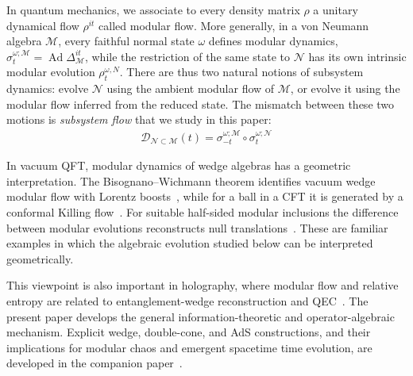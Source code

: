 \documentclass[a4paper,11pt]{article}
\theoremstyle{definition}
\newcommand{\mN}{\mathcal{N}}
\newcommand{\mM}{\mathcal{M}}
\begin{document}
In quantum mechanics, we associate to every density matrix $\rho$ a unitary dynamical flow $\rho^{it}$ called modular flow. More generally, in a von Neumann algebra $\mM$, every faithful normal state $\omega$ defines modular dynamics, $
    \sigma_t^{\omega;\mM}
    =
    \operatorname{Ad}\Delta_{\mM}^{it}$,
while the restriction of the same state to $\mN$ has its own intrinsic modular evolution $\rho_t^{\omega,N}$. There are thus two natural notions of subsystem dynamics: evolve $\mN$ using the ambient modular flow of $\mM$, or evolve it using the modular flow inferred from the reduced state.  The mismatch between these two motions is \emph{subsystem flow} that we study in this paper: 
\begin{align}
    \mathcal{D}_{\mN\subset\mM}(t)=\sigma_{-t}^{\omega;\mM}\circ \sigma_{t}^{\omega;\mN}
\end{align}


In vacuum QFT, modular dynamics of wedge algebras has a geometric interpretation. The Bisognano--Wichmann theorem identifies vacuum wedge modular flow with Lorentz boosts~\cite{BisognanoWichmann1975}, while for a ball in a CFT it is generated by a conformal Killing flow~\cite{CasiniHuertaMyers2011}. For suitable half-sided modular inclusions the difference between modular evolutions reconstructs null translations~\cite{Wiesbrock1993,Borchers1992}. These are familiar examples in which the algebraic evolution studied below can be interpreted geometrically.

This viewpoint is also important in holography, where modular flow and relative entropy are related to entanglement-wedge reconstruction and QEC~\cite{AlmheiriDongHarlow2015,JafferisLewkowyczMaldacenaSuh2016}. The present paper develops the general information-theoretic and operator-algebraic mechanism. Explicit wedge, double-cone, and AdS constructions, and their implications for modular chaos and emergent spacetime time evolution, are developed in the companion paper~\cite{companionQFT}.
\end{document}
